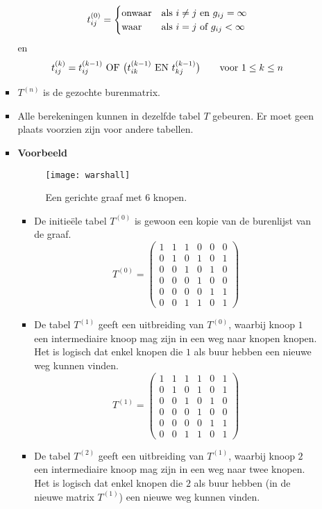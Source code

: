\begin{itemize}
\begin{enumerate}
\begin{itemize}
					$$t_{ij}^{(0)} = 
					\begin{cases}
						\hbox{onwaar} & \hbox{als } i \neq j \hbox{ en } g_{ij} = \infty\\
						\hbox{waar}   & \hbox{als } i = j \hbox{ of } g_{ij} < \infty
					\end{cases}$$
					en
					$$
						t_{ij}^{(k)} = t_{ij}^{(k - 1)} \hbox{ OF } \big(t_{ik}^{(k - 1)} \hbox{ EN } t_{kj}^{(k - 1)}\big) \qquad \hbox{voor } 1 \leq k \leq n
					$$
					\item $T^{(n)}$ is de gezochte burenmatrix.
					\item Alle berekeningen kunnen in dezelfde tabel $T$ gebeuren. Er moet geen plaats voorzien zijn voor andere tabellen.

					\item \textbf{Voorbeeld}
					\begin{figure}[ht]
						\centering
						\texttt{[image: warshall]}
						\caption{Een gerichte graaf met 6 knopen.}
						\label{fig:warshall}
					\end{figure}
					\begin{itemize}
						\item De initieële tabel $T^{(0)}$ is gewoon een kopie van de burenlijst van de graaf.
						$$T^{(0)} = \begin{pmatrix}
							1&1&1&0&0&0\\
							0&1&0&1&0&1\\
							0&0&1&0&1&0\\
							0&0&0&1&0&0\\
							0&0&0&0&1&1\\
							0&0&1&1&0&1
						\end{pmatrix}$$
						\item De tabel $T^{(1)}$ geeft een uitbreiding van $T^{(0)}$, waarbij knoop $1$ een intermediaire knoop mag zijn in een weg naar knopen knopen. Het is logisch dat enkel knopen die $1$ als buur hebben een nieuwe weg kunnen vinden.
						$$T^{(1)} = \begin{pmatrix}
							1&1&1&1&0&1\\
							0&1&0&1&0&1\\
							0&0&1&0&1&0\\
							0&0&0&1&0&0\\
							0&0&0&0&1&1\\
							0&0&1&1&0&1
						\end{pmatrix}$$
						\item De tabel $T^{(2)}$ geeft een uitbreiding van $T^{(1)}$, waarbij knoop $2$ een intermediaire knoop mag zijn in een weg naar twee knopen. Het is logisch dat enkel knopen die $2$ als buur hebben (in de nieuwe matrix $T^{(1)}$) een nieuwe weg kunnen vinden.

\end{itemize}
\end{itemize}
\end{enumerate}
\end{itemize}
